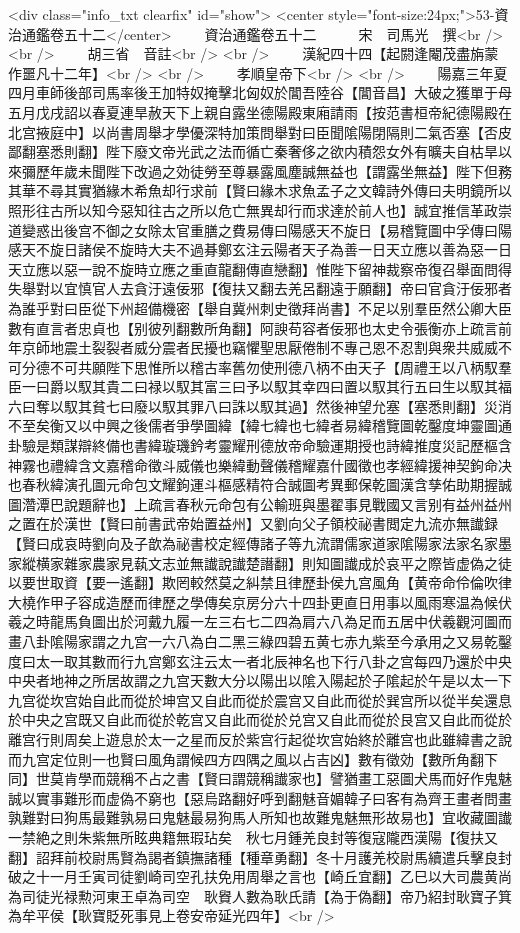 <div class="info_txt clearfix" id="show">
<center style="font-size:24px;">53-資治通鑑卷五十二</center>
  　　資治通鑑卷五十二　　　宋　司馬光　撰<br />
<br />
　　胡三省　音註<br />
<br />
　　漢紀四十四【起閼逢閹茂盡旃蒙作噩凡十二年】<br />
<br />
　　孝順皇帝下<br />
<br />
　　陽嘉三年夏四月車師後部司馬率後王加特奴掩擊北匈奴於閶吾陸谷【閶音昌】大破之獲單于母　五月戊戌詔以春夏連旱赦天下上親自露坐德陽殿東廂請雨【按范書桓帝紀德陽殿在北宫掖庭中】以尚書周舉才學優深特加策問舉對曰臣聞隂陽閉隔則二氣否塞【否皮鄙翻塞悉則翻】陛下廢文帝光武之法而循亡秦奢侈之欲内積怨女外有曠夫自枯旱以來彌歷年歲未聞陛下改過之効徒勞至尊暴露風塵誠無益也【謂露坐無益】陛下但務其華不尋其實猶緣木希魚却行求前【賢曰緣木求魚孟子之文韓詩外傳曰夫明鏡所以照形往古所以知今惡知往古之所以危亡無異却行而求達於前人也】誠宜推信革政崇道變惑出後宫不御之女除太官重膳之費易傳曰陽感天不旋日【易稽覽圖中孚傳曰陽感天不旋日諸侯不旋時大夫不過朞鄭玄注云陽者天子為善一日天立應以善為惡一日天立應以惡一說不旋時立應之重直龍翻傳直戀翻】惟陛下留神裁察帝復召舉面問得失舉對以宜慎官人去貪汙遠佞邪【復扶又翻去羌呂翻遠于願翻】帝曰官貪汙佞邪者為誰乎對曰臣從下州超備機密【舉自冀州刺史徵拜尚書】不足以别羣臣然公卿大臣數有直言者忠貞也【别彼列翻數所角翻】阿諛苟容者佞邪也太史令張衡亦上疏言前年京師地震土裂裂者威分震者民擾也竊懼聖思厭倦制不專己恩不忍割與衆共威威不可分德不可共願陛下思惟所以稽古率舊勿使刑德八柄不由天子【周禮王以八柄馭羣臣一曰爵以馭其貴二曰禄以馭其富三曰予以馭其幸四曰置以馭其行五曰生以馭其福六曰奪以馭其貧七曰廢以馭其罪八曰誅以馭其過】然後神望允塞【塞悉則翻】災消不至矣衡又以中興之後儒者爭學圖緯【緯七緯也七緯者易緯稽覽圖乾鑿度坤靈圖通卦驗是類謀辯終備也書緯璇璣鈐考靈耀刑德放帝命驗運期授也詩緯推度災記歷樞含神霧也禮緯含文嘉稽命徵斗威儀也樂緯動聲儀稽耀嘉什國徵也孝經緯援神契鉤命决也春秋緯演孔圖元命包文耀鉤運斗樞感精符合誠圖考異郵保乾圖漢含孳佑助期握誠圖濳潭巴說題辭也】上疏言春秋元命包有公輸班與墨翟事見戰國又言别有益州益州之置在於漢世【賢曰前書武帝始置益州】又劉向父子領校祕書閲定九流亦無䜟録【賢曰成哀時劉向及子歆為祕書校定經傳諸子等九流謂儒家道家隂陽家法家名家墨家縱横家雜家農家見蓻文志並無䜟說䜟楚譖翻】則知圖䜟成於哀平之際皆虚偽之徒以要世取資【要一遙翻】欺罔較然莫之糾禁且律歷卦侯九宫風角【黄帝命伶倫吹律大橈作甲子容成造歷而律歷之學傳矣京房分六十四卦更直日用事以風雨寒温為候伏羲之時龍馬負圖出於河戴九履一左三右七二四為肩六八為足而五居中伏羲觀河圖而畫八卦隂陽家謂之九宫一六八為白二黑三綠四碧五黄七赤九紫至今承用之又易乾鑿度曰太一取其數而行九宫鄭玄注云太一者北辰神名也下行八卦之宫每四乃還於中央中央者地神之所居故謂之九宫天數大分以陽出以隂入陽起於子隂起於午是以太一下九宫從坎宫始自此而從於坤宫又自此而從於震宫又自此而從於巽宫所以從半矣還息於中央之宫既又自此而從於乾宫又自此而從於兑宫又自此而從於艮宫又自此而從於離宫行則周矣上遊息於太一之星而反於紫宫行起從坎宫始終於離宫也此雖緯書之說而九宫定位則一也賢曰風角謂候四方四隅之風以占吉凶】數有徵効【數所角翻下同】世莫肯學而競稱不占之書【賢曰謂競稱䜟家也】譬猶畫工惡圖犬馬而好作鬼魅誠以實事難形而虚偽不窮也【惡烏路翻好呼到翻魅音媚韓子曰客有為齊王畫者問畫孰難對曰狗馬最難孰易曰鬼魅最易狗馬人所知也故難鬼魅無形故易也】宜收藏圖䜟一禁絶之則朱紫無所眩典籍無瑕玷矣　秋七月鍾羌良封等復寇隴西漢陽【復扶又翻】詔拜前校尉馬賢為謁者鎮撫諸種【種章勇翻】冬十月護羌校尉馬續遣兵擊良封破之十一月壬寅司徒劉崎司空孔扶免用周舉之言也【崎丘宜翻】乙巳以大司農黄尚為司徒光禄勲河東王卓為司空　耿䝿人數為耿氏請【為于偽翻】帝乃紹封耿寶子箕為牟平侯【耿寶貶死事見上卷安帝延光四年】<br />
